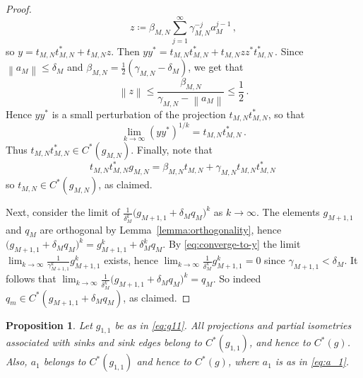 \documentclass[12pt, a4paper]
{amsart}
\newcommand{\norm}[1]{\left\|#1\right\|} %
\newtheorem{prop}[thm]{Proposition}
\theoremstyle{definition}
\theoremstyle{remark}
\numberwithin{equation}{section}
\newcommand{\Cstar}{\ensuremath{C^*}}
\begin{document}
\begin{proof}
\begin{equation}
    z \coloneq \beta_{M,N} \sum_{j=1}^\infty \gamma_{M,N}^{-j} a_M^{j-1}\,,
    \end{equation}
    so $y = t_{M,N}t_{M,N}^* + t_{M,N} z$. Then
    $
    yy^* = t_{M,N}t_{M,N}^* + t_{M,N} z z^* t_{M,N}^*\,.
    $
    Since $\norm{a_M} \le \delta_M$ and $\beta_{M,N} = \frac{1}{2} (\gamma_{M,N} - \delta_M)$, we get that
    \begin{equation}
    \norm{z} \leq \frac{\beta_{M,N}}{\gamma_{M,N} - \norm{a_M}} \leq \frac{1}{2}\,.
    \end{equation}
    Hence $yy^*$ is a small perturbation of the projection $t_{M,N}t_{M,N}^*$, so that
    \begin{equation}
    \lim_{k\to\infty} (yy^*)^{1/k} = t_{M,N}t_{M,N}^*\,.
    \end{equation}
    Thus $t_{M,N}t_{M,N}^* \in C^*(g_{M,N})$. Finally, note that
    \begin{equation}
    t_{M,N}t_{M,N}^* g_{M,N} = \beta_{M,N} t_{M,N} + \gamma_{M,N} t_{M,N}t_{M,N}^*\,
    \end{equation}
    so $t_{M,N} \in C^*(g_{M,N})$, as claimed.

    Next, consider the limit of $\frac{1}{\delta_M^k}\big(g_{M+1,1} + \delta_M q_M\big)^k$ as $k \to \infty$. The elements $g_{M+1,1}$ and $q_M$ are orthogonal by Lemma~\ref{lemma:orthogonality}, hence $\big(g_{M+1,1} + \delta_M q_M\big)^k = g_{M+1,1}^k + \delta_M^k q_M$. By \eqref{eq:converge-to-y} the limit $\lim_{k \to \infty}\frac{1}{\gamma_{M+1,1}^k}g_{M+1,1}^k$ exists, hence $\lim_{k \to \infty}\frac{1}{\delta_{M}^k}g_{M+1,1}^k = 0$ since $\gamma_{M+1,1} < \delta_M$. It follows that $\lim_{k \to \infty} \frac{1}{\delta_M^k}\big(g_{M+1,1} + \delta_M q_M\big)^k = q_M$. So indeed $q_m \in \Cstar(g_{M+1,1} + \delta_M q_M)$, as claimed.
\end{proof}




\begin{prop}
\label{prop:proposition-4-part2}
    Let $g_{1,1}$ be as in \eqref{eq:g11}. All projections and partial isometries associated with sinks and sink edges belong to $\Cstar(g_{1,1})$, and hence to $\Cstar(g)$. 
    Also, $a_1$ belongs to $C^*(g_{1,1})$ and hence to $\Cstar(g)$, where $a_1$ is as in \eqref{eq:a_1}.
\end{prop}
\end{document}
